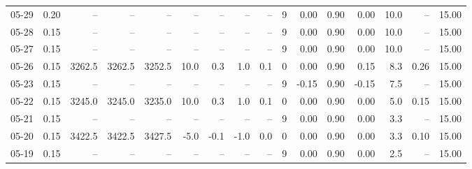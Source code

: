 \begin{threeparttable}
{\begin{tabular}{lrrrrrrrrrrrrrrr}
  05-29 &     0.20 &     -- &     -- &     -- &         -- &             -- &                       -- &                  -- &              9 &       0.00 &      0.90 &           0.00 &             10.0 &              -- &                  15.00 \\
  05-28 &     0.15 &     -- &     -- &     -- &         -- &             -- &                       -- &                  -- &              9 &       0.00 &      0.90 &           0.00 &             10.0 &              -- &                  15.00 \\
  05-27 &     0.15 &     -- &     -- &     -- &         -- &             -- &                       -- &                  -- &              9 &       0.00 &      0.90 &           0.00 &             10.0 &              -- &                  15.00 \\
  05-26 &     0.15 & 3262.5 & 3262.5 & 3252.5 &       10.0 &            0.3 &                      1.0 &                 0.1 &              0 &       0.00 &      0.90 &           0.15 &              8.3 &            0.26 &                  15.00 \\
  05-23 &     0.15 &     -- &     -- &     -- &         -- &             -- &                       -- &                  -- &              9 &      -0.15 &      0.90 &          -0.15 &              7.5 &              -- &                  15.00 \\
  05-22 &     0.15 & 3245.0 & 3245.0 & 3235.0 &       10.0 &            0.3 &                      1.0 &                 0.1 &              0 &       0.00 &      0.90 &           0.00 &              5.0 &            0.15 &                  15.00 \\
  05-21 &     0.15 &     -- &     -- &     -- &         -- &             -- &                       -- &                  -- &              9 &       0.00 &      0.90 &           0.00 &              3.3 &              -- &                  15.00 \\
  05-20 &     0.15 & 3422.5 & 3422.5 & 3427.5 &       -5.0 &           -0.1 &                     -1.0 &                 0.0 &              0 &       0.00 &      0.90 &           0.00 &              3.3 &            0.10 &                  15.00 \\
  05-19 &     0.15 &     -- &     -- &     -- &         -- &             -- &                       -- &                  -- &              9 &       0.00 &      0.90 &           0.00 &              2.5 &              -- &                  15.00 \\

\end{tabular}}
\end{threeparttable}
